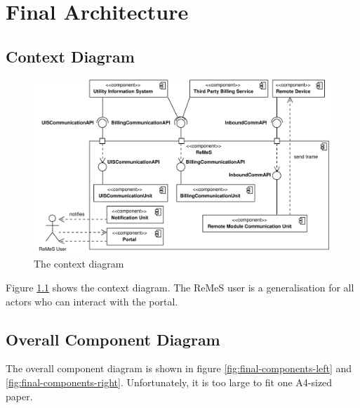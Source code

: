 \chapter{Final Architecture}
\label{chap:final-architecture}

\section{Context Diagram}

\begin{figure}[H]
	\begin{centering}
		\includegraphics[width=\textwidth]{figs/final-context.pdf}
		\caption{The context diagram}
		\label{fig:final-context}
	\end{centering}
\end{figure}

\npar Figure \ref{fig:final-context} shows the context diagram. The ReMeS
user is a generalisation for all actors who can interact with the portal. 

\section{Overall Component Diagram}

\npar The overall component diagram is shown in figure
\ref{fig:final-components-left} and \ref{fig:final-components-right}.
Unfortunately, it is too large to fit one A4-sized paper. 

